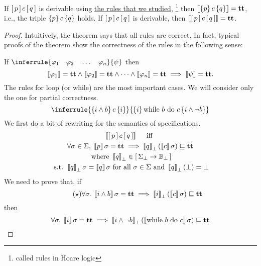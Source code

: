 \begin{theorem}
	If $\left[ \, p \, \right] c \left[ \, q \, \right]$ is derivable using
	\ul{the rules that we studied},
	\footnote{called rules in Hoare logic}
	then $\left\llbracket \left\{ p \right\} c \left\{ q \right\} \right\rrbracket = \textbf{tt}$, i.e.,
	the triple $\left\{ p \right\} c \left\{ q \right\}$ holds.
	If $\left[ \, p \, \right] c \left[ \, q \, \right]$ is derivable, then
	$\left\llbracket \left[ \, p \, \right] c \left[ \, q \, \right] \right\rrbracket = \textbf{tt}$.
\end{theorem}
%
\begin{proof}
	Intuitively, the theorem says that all rules are correct.
	In fact, typical proofs of the theorem show the correctness of the rules in the
	following sense:

	If $\inferrule{\varphi_1 \quad \varphi_2 \quad \dots \quad \varphi_n}{\psi}$
	then
	\[
		\left\llbracket \varphi_1 \right\rrbracket = \textbf{tt} \wedge
		\left\llbracket \varphi_2 \right\rrbracket = \textbf{tt} \wedge \dots \wedge
		\left\llbracket \varphi_n \right\rrbracket = \textbf{tt} \implies
		\left\llbracket \psi \right\rrbracket = \textbf{tt}.
	\]
	The rules for loop (or while) are the most important cases.
	We will consider only the one for partial correctness.
	\[
		\inferrule
		{\braces{i \wedge b} c \braces{i}}
		{\braces{i} \cwhile{b}{c} \braces{i \wedge \neg b}}
	\]
	We first do a bit of rewriting for the semantics of specifications.
	\begin{multline*}
		\left\llbracket \left[ \, p \, \right] c \left[ \, q \, \right] \right\rrbracket
		\quad \textrm{ iff } \\
		\forall \sigma \in \Sigma ,\;
		\left\llbracket p \right\rrbracket \sigma = \textbf{tt} \implies
		\left\llbracket q \right\rrbracket_\bot \left( \left\llbracket c \right\rrbracket \sigma \right) \sqsubseteq \textbf{tt} \\
		\textrm{ where }
		\left\llbracket q \right\rrbracket_\bot \in \left[ \, \Sigma_\bot \to \mathbb{B}_\bot \, \right] \\
		\textrm{ s.t. }
		\left\llbracket q \right\rrbracket_\bot \sigma = \left\llbracket q \right\rrbracket \sigma \textrm{ for all } \sigma \in \Sigma
		\textrm{ and }
		\left\llbracket q \right\rrbracket_\bot \left( \bot \right) = \bot
	\end{multline*}
	We need to prove that, if
	\begin{equation}{} \label{eq:while-partial-correctness} \tag{$\star$}
		\forall \sigma .\;
		\left\llbracket i \wedge b \right\rrbracket \sigma = \textbf{tt} \implies
		\left\llbracket i \right\rrbracket_\bot \left( \left\llbracket c \right\rrbracket \sigma \right) \sqsubseteq \textbf{tt}
	\end{equation}
	then
	\[
		\forall \sigma .\;
		\left\llbracket i \right\rrbracket \sigma = \textbf{tt} \implies
		\left\llbracket i \wedge \neg b \right\rrbracket_\bot \left( \left\llbracket \textrm{while } b \textrm{ do } c \right\rrbracket \sigma \right) \sqsubseteq \textbf{tt}
	\]


\end{proof}
